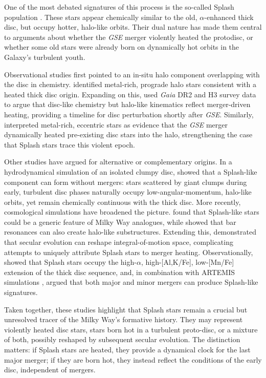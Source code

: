 \documentclass[fleqn,usenatbib]{mnras}
\begin{document}
One of the most debated signatures of this process is the so-called Splash population \citep{Belokurov2020, Belokurov2022}. These stars appear chemically similar to the old, $\alpha$-enhanced thick disc, but occupy hotter, halo-like orbits. Their dual nature has made them central to arguments about whether the \textit{GSE} merger violently heated the protodisc, or whether some old stars were already born on dynamically hot orbits in the Galaxy’s turbulent youth.

Observational studies first pointed to an in-situ halo component overlapping with the disc in chemistry. \citet{Bonaca2017} identified metal-rich, prograde halo stars consistent with a heated thick disc origin. Expanding on this, \citet{Bonaca2020} used \textit{Gaia} DR2 and H3 survey data to argue that disc-like chemistry but halo-like kinematics reflect merger-driven heating, providing a timeline for disc perturbation shortly after \textit{GSE}. Similarly, \citet{DiMatteo2019,DiMatteo2020} interpreted metal-rich, eccentric stars as evidence that the \textit{GSE} merger dynamically heated pre-existing disc stars into the halo, strengthening the case that Splash stars trace this violent epoch.

Other studies have argued for alternative or complementary origins. In a hydrodynamical simulation of an isolated clumpy disc, \citet{Amarante2020} showed that a Splash-like component can form without mergers: stars scattered by giant clumps during early, turbulent disc phases naturally occupy low-angular-momentum, halo-like orbits, yet remain chemically continuous with the thick disc. More recently, cosmological simulations have broadened the picture. \citet{Dillamore2022} found that Splash-like stars could be a generic feature of Milky Way analogues, while \citet{Dillamore2023} showed that bar resonances can also create halo-like substructures. Extending this, \citet{Dillamore2025} demonstrated that secular evolution can reshape integral-of-motion space, complicating attempts to uniquely attribute Splash stars to merger heating. Observationally, \citet{Kisku2025} showed that Splash stars occupy the high-$\alpha$, high-[Al,K/Fe], low-[Mn/Fe] extension of the thick disc sequence, and, in combination with ARTEMIS simulations \citep{Font2020}, argued that both major and minor mergers can produce Splash-like signatures.

Taken together, these studies highlight that Splash stars remain a crucial but unresolved tracer of the Milky Way’s formative history. They may represent violently heated disc stars, stars born hot in a turbulent proto-disc, or a mixture of both, possibly reshaped by subsequent secular evolution. The distinction matters: if Splash stars are heated, they provide a dynamical clock for the last major merger; if they are born hot, they instead reflect the conditions of the early disc, independent of mergers.
\end{document}
